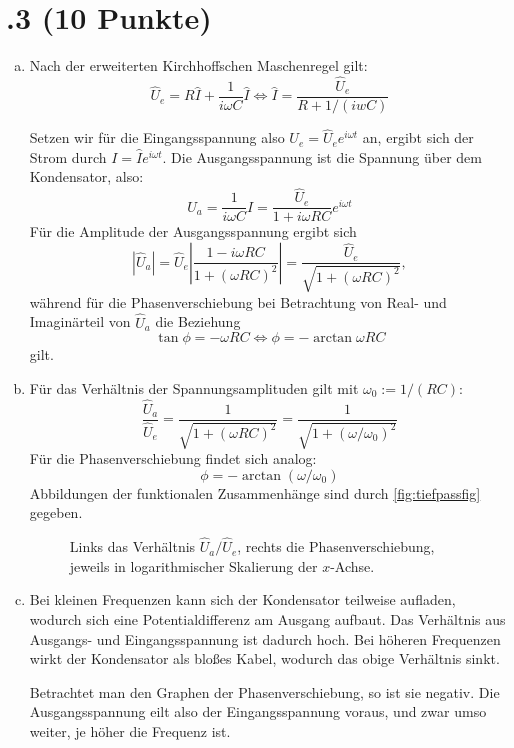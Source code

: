 \section*{\nr.3 \titthree (10 Punkte)}
\begin{enumerate}[(a)]
\item Nach der erweiterten Kirchhoffschen Maschenregel gilt:
\begin{equation}
\hat{U}_e = R \hat{I} +\frac{1}{i\omega C}\hat{I} \iff \hat{I} =\frac{\hat{U}_e}{R+1/(iwC)}
\end{equation}

Setzen wir für die Eingangsspannung also $U_e=\hat{U}_e e^{i\omega t}$ an, ergibt sich der Strom durch $I=\hat{I} e^{i\omega t}$. Die Ausgangsspannung ist die Spannung über dem Kondensator, also:
\begin{equation}
U_a = \frac{1}{i\omega C}I = \frac{\hat{U}_e}{1+i\omega RC} e^{i\omega t}
\end{equation}
Für die Amplitude der Ausgangsspannung ergibt sich
\begin{equation}
|\hat{U}_a| = \hat{U}_e \left| \frac{1-i\omega RC}{1+(\omega R C)^2} \right| = \frac{\hat{U}_e}{\sqrt{1+(\omega R C)^2}},
\end{equation}
während für die Phasenverschiebung bei Betrachtung von Real- und Imaginärteil von $\hat{U}_a$ die Beziehung
\begin{equation}
\tan{\phi} = -\omega R C \iff \phi = -\arctan{\omega R C}
\end{equation}
gilt.
\item
Für das Verhältnis der Spannungsamplituden gilt mit $\omega_0 := 1/(RC)$:
\begin{equation}
\frac{\hat{U}_a}{\hat{U}_e} = \frac{1}{\sqrt{1+(\omega R C )^2}} = \frac{1}{\sqrt{1+(\omega/\omega_0)^2}}
\end{equation}
Für die Phasenverschiebung findet sich analog:
\begin{equation}
\phi = -\arctan (\omega/\omega_0)
\end{equation}
Abbildungen der funktionalen Zusammenhänge sind durch \vref{fig:tiefpassfig} gegeben.
\begin{figure}[htbp]
\centering
\hfill

\caption{Links das Verhältnis $\hat{U}_a/\hat{U}_e$, rechts die Phasenverschiebung, jeweils in logarithmischer Skalierung der $x$-Achse.}
\label{fig:tiefpassfig}
\end{figure}

\item Bei kleinen Frequenzen kann sich der Kondensator teilweise aufladen, wodurch sich eine Potentialdifferenz am Ausgang aufbaut. Das Verhältnis aus Ausgangs- und Eingangsspannung ist dadurch hoch. Bei höheren Frequenzen wirkt der Kondensator als bloßes Kabel, wodurch das obige Verhältnis sinkt.

Betrachtet man den Graphen der Phasenverschiebung, so ist sie negativ. Die Ausgangsspannung eilt also der Eingangsspannung voraus, und zwar umso weiter, je höher die Frequenz ist. 

\end{enumerate}
